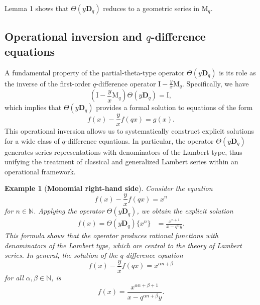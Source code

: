 \documentclass[12pt]{article}
\newcommand{\N}{\mathbb{N}}
\newcommand{\M}{\mathrm{M}}
\newcommand{\I}{\mathrm{I}}
\newcommand{\D}{\mathbf{D}}
\newcommand{\thp}{\Theta}
\newtheorem{example}{Example}
\begin{document}
Lemma 1 shows that $\thp(y\D_q)$ reduces to a geometric series in $\M_q$. 

\subsection{Operational inversion and $q$-difference equations}

A fundamental property of the partial-theta-type operator $\thp(y\D_q)$ is its role as the inverse of the first-order $q$-difference operator $\I-\frac{y}{x}\M_q$. Specifically, we have 
\begin{equation}
    (\I-\frac{y}{x}\M_q)\thp(y\D_q)=\I,
\end{equation}
which implies that $\thp(y\D_q)$ provides a formal solution to equations of the form
\begin{equation}
    f(x)-\frac{y}{x}f(qx)=g(x).
\end{equation}
This operational inversion allows us to systematically construct explicit solutions for a wide class of $q$-difference equations. In particular, the operator $\thp(y\D_q)$ generates series representations with denominators of the Lambert type, thus unifying the treatment of classical and generalized Lambert series within an operational framework.

\begin{example}[\bf Monomial right-hand side]\label{exa_lambert}
Consider the equation
\begin{equation}
    f(x)-\frac{y}{x}f(qx)=x^n
\end{equation}
for $n\in\N$. Applying the operator $\thp(y\D_q)$, we obtain the explicit solution
\begin{align}
        f(x)=\thp(y\D_{q})\big\{x^{n}\big\}&=\frac{x^{n+1}}{x-q^ny}.
    \end{align}
This formula shows that the operator produces rational functions with denominators of the Lambert type, which are central to the theory of Lambert series. In general, the solution of the $q$-difference equation
\begin{equation}
    f(x)-\frac{y}{x}f(qx)=x^{\alpha n+\beta}
\end{equation}
for all $\alpha,\beta\in\N$, is
    \begin{equation}
        f(x)=\frac{x^{\alpha n+\beta+1}}{x-q^{\alpha n+\beta}y}.
    \end{equation}
\end{example}
\end{document}

